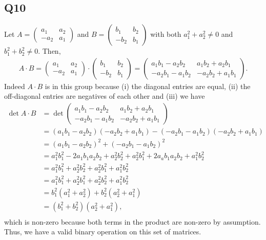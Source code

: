 \documentclass[12pt]{article}
\numberwithin{theorem}{section}
\numberwithin{equation}{section}
\numberwithin{remark}{section}
\numberwithin{definition}{section}
\numberwithin{theorem}{section}
\numberwithin{lemma}{section}
\numberwithin{example}{section}
\begin{document}
\subsection{Q10}

Let $A=\begin{pmatrix}a_1 & a_2 \\ -a_2 & a_1 \end{pmatrix}$ and $B=\begin{pmatrix}b_1 & b_2 \\ -b_2 & b_1 \end{pmatrix}$ with both $a_1^2+a_2^2\neq 0$ and $b_1^2+b_2^2\neq 0$. Then,
\begin{align*}
	A\cdot B = \begin{pmatrix}a_1 & a_2 \\ -a_2 & a_1 \end{pmatrix} \cdot \begin{pmatrix}b_1 & b_2 \\ -b_2 & b_1 \end{pmatrix} = \begin{pmatrix}a_1b_1-a_2b_2 & a_1b_2+a_2b_1 \\ -a_2b_1-a_1b_2 & -a_2b_2+a_1b_1 \end{pmatrix}.
\end{align*}
Indeed $A\cdot B$ is in this group because (i) the diagonal entries are equal, (ii) the off-diagonal entries are negatives of each other and (iii) we have
\begin{align*}
	\det{A\cdot B} & = \det{\begin{pmatrix}a_1b_1-a_2b_2 & a_1b_2+a_2b_1 \\ -a_2b_1-a_1b_2 & -a_2b_2+a_1b_1 \end{pmatrix}} \\
	& = (a_1b_1-a_2b_2)(-a_2b_2+a_1b_1)-(-a_2b_1-a_1b_2)(-a_2b_2+a_1b_1)\\
	& = (a_1b_1-a_2b_2)^2+(-a_2b_1-a_1b_2)^2\\
	& = a_1^2b_1^2-2a_1b_1a_2b_2+a_2^2b_2^2+a_2^2b_1^2+2a_ab_1a_2b_2+a_1^2b_2^2\\
	& = a_1^2b_1^2+a_2^2b_2^2+a_2^2b_1^2+a_1^2b_2^2\\
	& = a_1^2b_1^2+a_2^2b_1^2+a_2^2b_2^2+a_1^2b_2^2\\
	& = b_1^2(a_1^2+a_2^2)+b_2^2(a_2^2+a_1^2)\\
	& = (b_1^2+b_2^2)(a_2^2+a_1^2),\\
\end{align*}
which is non-zero because both terms in the product are non-zero by assumption. Thus, we have a valid binary operation on this set of matrices. 
\end{document}
